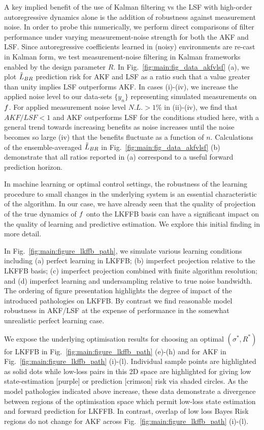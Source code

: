 A key implied benefit of the use of Kalman filtering vs the LSF with high-order autoregressive dynamics alone is the addition of robustness against measurement noise.  In order to probe this numerically, we perform direct comparisons of filter performance under varying measurement-noise strength for both the AKF and LSF.  Since autoregressive coefficients learned in (noisy) environments are re-cast in Kalman form, we test measurement-noise filtering in Kalman frameworks enabled by the design parameter $R$. In Fig.~\ref{fig:main:fig_data_akfvlsf} (a), we plot $\tilde{L}_{BR}$ prediction risk for AKF and LSF as a ratio such that a value greater than unity implies LSF outperforms AKF. In cases (i)-(iv), we increase the applied noise level to our data-sets $\{ y_n \}$ representing simulated measurements on $f$. For applied measurement noise level $N.L. > 1\%$ in (ii)-(iv), we find that $AKF/LSF <1 $ and AKF outperforms LSF for the conditions studied here, with a general trend towards increasing benefits as noise increases until the noise becomes so large (iv) that the benefits fluctuate as a function of $n$. Calculations of the ensemble-averaged $\tilde{L}_{BR}$ in Fig.~\ref{fig:main:fig_data_akfvlsf} (b) demonstrate that all ratios reported in (a) correspond to a useful forward prediction horizon. 


In machine learning or optimal control settings, the robustness of the learning procedure to small changes in the underlying system is an essential characteristic of the algorithm.  In our case, we have already seen that the quality of projection of the true dynamics of $f$ onto the LKFFB basis can have a significant impact on the quality of learning and predictive estimation.  We explore this initial finding in more detail.  

In Fig.~\ref{fig:main:figure_lkffb_path}, we simulate various learning conditions including (a) perfect learning in LKFFB; (b) imperfect projection relative to the LKFFB basis; (c) imperfect projection combined with finite algorithm resolution; and (d) imperfect learning and undersampling relative to true noise bandwidth. The ordering of figure presentation highlights the degree of impact of the introduced pathologies on LKFFB.  By contrast we find reasonable model robustness in AKF/LSF at the expense of performance in the somewhat unrealistic perfect learning case.  

We expose the underlying optimisation results for choosing an optimal $(\sigma^*, R^*)$ for LKFFB in Fig.~\ref{fig:main:figure_lkffb_path} (e)-(h) and for AKF in Fig.~\ref{fig:main:figure_lkffb_path} (i)-(l). Individual sample points are highlighted as solid dots while low-loss pairs in this 2D space are highlighted for giving low state-estimation [purple] or prediction [crimson] risk via shaded circles.  As the model pathologies indicated above increase, these data demonstrate a divergence between regions of the optimisation space which permit low-loss state estimation and forward prediction for LKFFB.  In contrast, overlap of low loss Bayes Risk regions do not change for AKF across Fig.~\ref{fig:main:figure_lkffb_path} (i)-(l).

